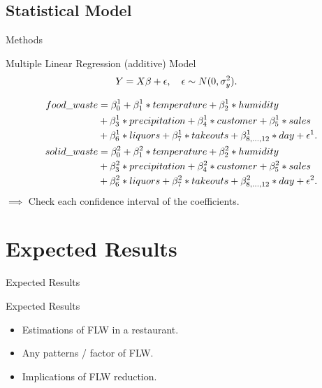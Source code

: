\documentclass{beamer}
\begin{document}
\subsection{Statistical Model}
\begin{frame}{Methods}
    \small
    \begin{block}{Multiple Linear Regression (additive) Model}
        \[
        \begin{aligned}
            \small Y &=  X\beta + \epsilon, \hspace{1em}
            \epsilon \sim N(0, \sigma_y^2).
        \end{aligned}
        \]
    \end{block}
    \begin{align*}
        \small food\_waste 
        &= \beta_0^1 + \beta_1^1 * temperature + \beta_2^1 * humidity \\
        &+ \beta_3^1 * precipitation + \beta_4^1 * customer + \beta_5^1 * sales\\ 
        &+ \beta_6^1 * liquors + \beta_7^1 * takeouts 
        + \beta_{8,...,12}^1 * day + \epsilon^1.\\
        \small solid\_waste 
        &= \beta_0^2 + \beta_1^2 * temperature + \beta_2^2 * humidity \\
        &+ \beta_3^2 * precipitation + \beta_4^2 * customer + \beta_5^2 * sales\\ 
        &+ \beta_6^2 * liquors + \beta_7^2 * takeouts 
        + \beta_{8,...,12}^2 * day + \epsilon^2.
    \end{align*}
    \normalsize $\implies$ Check each confidence interval of the coefficients.
\end{frame}

\section{Expected Results}
\begin{frame}{Expected Results}
    \begin{block}{Expected Results}
        \begin{itemize}
            \item Estimations of FLW in a restaurant.
            \item Any patterns / factor of FLW.
            \item Implications of FLW reduction.
        \end{itemize}
    \end{block}
\end{frame}
\end{document}
